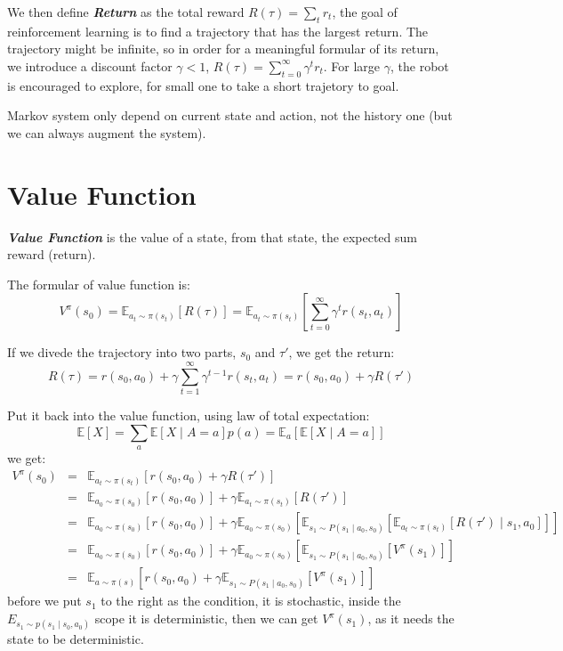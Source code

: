 \documentclass[10pt]{elegantbook}
\newcommand{\mydefination}[1]{\textbf{\textit{\textcolor{structurecolor}{#1}}}}
\begin{document}
We then define \mydefination{Return} as the total reward $R(\tau) = \sum_t r_t$, 
the goal of reinforcement learning is to find a trajectory that has the largest return. The trajectory might be infinite, so in order for a 
meaningful formular of its return, we introduce a discount factor $\gamma < 1$, $R(\tau) = \sum_{t=0}^{\infty}\gamma^tr_t$. For large $\gamma$, 
the robot is encouraged to explore, for small one to take a short trajetory to goal.

Markov system only depend on current state and action, not the history one (but we can always augment the system).

\section{Value Function}
\mydefination{Value Function} is the value of a state, from that state, the expected sum reward (return). 

The formular of value function is:
\begin{equation}
    V^{\pi}(s_0) = \mathbb E_{a_t \sim \pi(s_t)}[R(\tau)] = \mathbb E_{a_t \sim \pi(s_t)}\left[ \sum_{t=0}^{\infty}\gamma^tr(s_t, a_t) \right]
\end{equation} 

If we divede the trajectory into two parts, $s_0$ and $\tau'$, we get the return:
\[ R(\tau) = r(s_0, a_0) + \gamma \sum_{t=1}^{\infty}\gamma^{t-1}r(s_t, a_t) = r(s_0, a_0) + \gamma R(\tau') \]

Put it back into the value function, using law of total expectation:
\[ \mathbb E[X] = \sum_a \mathbb E[X \mid A=a]p(a) = \mathbb E_a \left [\mathbb E[X \mid A=a] \right ] \]
we get:
\begin{equation}
    \begin{array}{lll}
    V^{\pi}(s_0) &=& \mathbb E_{a_t \sim \pi(s_t)}[r(s_0, a_0) + \gamma R(\tau')] \\
                 &=& \mathbb E_{a_0 \sim \pi(s_0)}[r(s_0, a_0)] + \gamma \mathbb E_{a_t \sim \pi(s_t)}[R(\tau')] \\
                 &=& \mathbb E_{a_0 \sim \pi(s_0)}[r(s_0, a_0)] + \gamma \mathbb E_{a_0 \sim \pi(s_0)}\left[\mathbb E_{s_1 \sim P(s_1 \mid a_0, s_0)}[\mathbb E_{a_t \sim \pi(s_t)}[R(\tau') \mid s_1, a_0]]\right] \\ 
                 &=& \mathbb E_{a_0 \sim \pi(s_0)}[r(s_0, a_0)] + \gamma \mathbb E_{a_0 \sim \pi(s_0)}\left[\mathbb E_{s_1 \sim P(s_1 \mid a_0, s_0)}[V^{\pi}(s_1)]\right] \\
                 &=& \mathbb E_{a \sim \pi(s)}\left[ r(s_0, a_0) + \gamma \mathbb E_{s_1 \sim P(s_1 \mid a_0, s_0)} [V^{\pi}(s_1)] \right]
    \end{array}
\end{equation}
before we put $s_1$ to the right as the condition, it is stochastic, inside the $E_{s_1 \sim p(s_1 \mid s_0, a_0)}$ scope it is deterministic, 
then we can get $V^{\pi}(s_1)$, as it needs the state to be deterministic.
\end{document}
